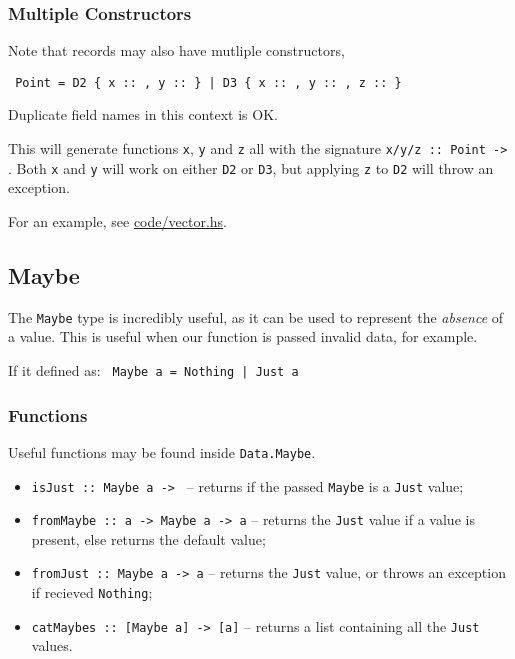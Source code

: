 \subsubsection{Multiple Constructors}
Note that records may also have mutliple constructors,

\texttt{ Point = D2 \{ x :: , y ::  \} | D3 \{ x :: , y :: , z ::  \}}

Duplicate field names in this context is OK.

This will generate functions \texttt{x}, \texttt{y} and \texttt{z} all with the signature \texttt{x/y/z :: Point -> }. Both \texttt{x} and \texttt{y} will work on either \texttt{D2} or \texttt{D3}, but applying \texttt{z} to \texttt{D2} will throw an exception.

For an example, see \url{code/vector.hs}.

\subsection{Maybe}
The \texttt{Maybe} type is incredibly useful, as it can be used to represent the \textit{absence} of a value. This is useful when our function is passed invalid data, for example.

If it defined as: \texttt{ Maybe a = Nothing | Just a}

\subsubsection{Functions}
Useful functions may be found inside \texttt{Data.Maybe}.
\begin{itemize}
  \item \texttt{isJust :: Maybe a -> } -- returns if the passed \texttt{Maybe} is a \texttt{Just} value;
  \item \texttt{fromMaybe :: a -> Maybe a -> a} -- returns the \texttt{Just} value if a value is present, else returns the default value;
  \item \texttt{fromJust :: Maybe a -> a} -- returns the \texttt{Just} value, or throws an exception if recieved \texttt{Nothing};
  \item \texttt{catMaybes :: [Maybe a] -> [a]} -- returns a list containing all the \texttt{Just} values.
\end{itemize}